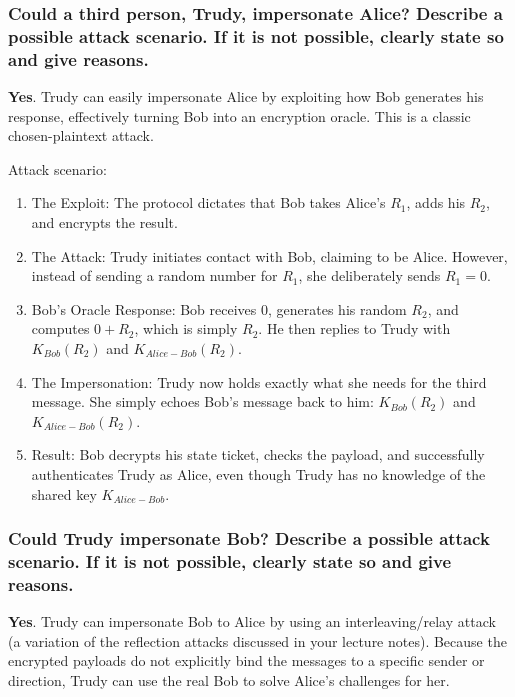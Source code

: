 \subsubsection*{%
    Could a third person, Trudy, impersonate Alice? Describe a possible
    attack scenario. If it is not possible, clearly state so and give reasons.%
}
\textbf{Yes}. Trudy can easily impersonate Alice by exploiting how Bob generates
his response, effectively turning Bob into an encryption oracle. This is a
classic chosen-plaintext attack.

Attack scenario:
\begin{enumerate}
    \item The Exploit: The protocol dictates that Bob takes Alice's $R_1$, adds
    his $R_2$, and encrypts the result.
    
    \item The Attack: Trudy initiates contact with Bob, claiming to be Alice.
    However, instead of sending a random number for $R_1$, she deliberately
    sends $R_1 = 0$.

    \item Bob's Oracle Response: Bob receives $0$, generates his random $R_2$,
    and computes $0 + R_2$, which is simply $R_2$. He then replies to Trudy with
    $K_{Bob}(R_2)$ and $K_{Alice-Bob}(R_2)$.

    \item The Impersonation: Trudy now holds exactly what she needs for the
    third message. She simply echoes Bob's message back to him: $K_{Bob}(R_2)$
    and $K_{Alice-Bob}(R_2)$.

    \item Result: Bob decrypts his state ticket, checks the payload, and
    successfully authenticates Trudy as Alice, even though Trudy has no
    knowledge of the shared key $K_{Alice-Bob}$.
\end{enumerate}


\subsubsection*{%
    Could Trudy impersonate Bob? Describe a possible attack scenario. If
    it is not possible, clearly state so and give reasons.%
}
\textbf{Yes}. Trudy can impersonate Bob to Alice by using an interleaving/relay
attack (a variation of the reflection attacks discussed in your lecture notes).
Because the encrypted payloads do not explicitly bind the messages to a specific
sender or direction, Trudy can use the real Bob to solve Alice's challenges for
her.

